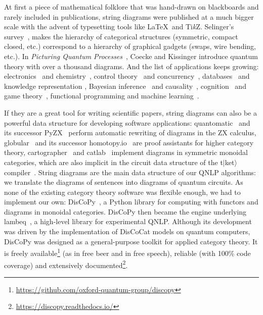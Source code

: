 At first a piece of mathematical folklore that was hand-drawn on blackboards and rarely included in publications, string diagrams were published at a much bigger scale with the advent of typesetting tools like \LaTeX \ and Ti\emph{k}Z.
Selinger's survey~\cite{Selinger10}, makes the hierarchy of categorical structures (symmetric, compact closed, etc.) correspond to a hierarchy of graphical gadgets (swaps, wire bending, etc.).
In \emph{Picturing Quantum Processes}~\cite{CoeckeKissinger17}, Coecke and Kissinger introduce quantum theory with over a thousand diagrams.
And the list of applications keeps growing:
electronics~\cite{BaezFong15} and chemistry~\cite{BaezPollard17},
control theory~\cite{BaezErbele14} and concurrency~\cite{BonchiEtAl14a},
databases~\cite{BonchiEtAl18} and knowledge representation \cite{Patterson17},
Bayesian inference~\cite{CoeckeSpekkens12,ChoJacobs19} and causality~\cite{KissingerUijlen19},
cognition~\cite{BoltEtAl17} and game theory~\cite{GhaniEtAl18},
functional programming \cite{Riley18} and machine learning~\cite{FongEtAl17}.

If they are a great tool for writing scientific papers, string diagrams can also be a powerful data structure for developing software applications:
quantomatic~\cite{KissingerZamdzhiev15} and its successor PyZX~\cite{KissingerVanDeWetering19} perform automatic rewriting of diagrams in the ZX calculus,
globular~\cite{BarEtAl18} and its successor homotopy.io~\cite{ReutterVicary19} are proof assistants for higher category theory,
cartographer~\cite{SobocinskiEtAl19} and catlab~\cite{PattersonEtAl21} implement diagrams in symmetric monoidal categories, which are also implicit in the circuit data structure of the t$|$ket$\rangle$ compiler~\cite{SivarajahEtAl20}.
String diagrams are the main data structure of our QNLP algorithms: we translate the diagrams of sentences into diagrams of quantum circuits.
As none of the existing category theory software was flexible enough, we had to implement our own: DisCoPy~\cite{FeliceEtAl20}, a Python library for computing with functors and diagrams in monoidal categories.
DisCoPy then became the engine underlying lambeq~\cite{KartsaklisEtAl21}, a high-level library for experimental QNLP.
Although its development was driven by the implementation of DisCoCat models on quantum computers, DisCoPy was designed as a general-purpose toolkit for applied category theory.
It is freely available\footnote{\url{https://github.com/oxford-quantum-group/discopy}} (as in free beer and in free speech), reliable (with 100\% code coverage) and extensively documented\footnote{\url{https://discopy.readthedocs.io/}}.


